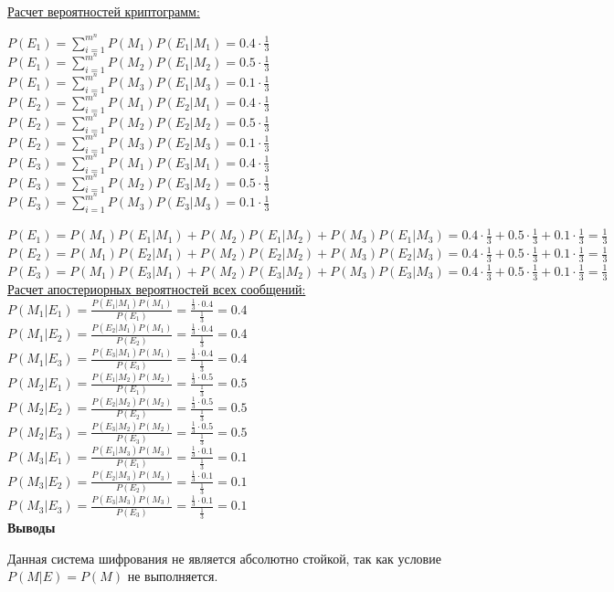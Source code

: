 \documentclass[a4paper,14pt]{extarticle}
\begin{document}
    \underline{Расчет вероятностей криптограмм:}
    \begin{multicols}{2}
    \noindent$P(E_1)=\sum\limits_{i=1}^{m^n} P(M_1)P(E_1|M_1) = 0.4\cdot\frac{1}{3}$\\
    $P(E_1)=\sum\limits_{i=1}^{m^n} P(M_2)P(E_1|M_2) = 0.5\cdot\frac{1}{3}$\\
    $P(E_1)=\sum\limits_{i=1}^{m^n} P(M_3)P(E_1|M_3) = 0.1\cdot\frac{1}{3}$\\
    $P(E_2)=\sum\limits_{i=1}^{m^n} P(M_1)P(E_2|M_1) = 0.4\cdot\frac{1}{3}$\\
    $P(E_2)=\sum\limits_{i=1}^{m^n} P(M_2)P(E_2|M_2) = 0.5\cdot\frac{1}{3}$\\
    $P(E_2)=\sum\limits_{i=1}^{m^n} P(M_3)P(E_2|M_3) = 0.1\cdot\frac{1}{3}$\\
    $P(E_3)=\sum\limits_{i=1}^{m^n} P(M_1)P(E_3|M_1) = 0.4\cdot\frac{1}{3}$\\
    $P(E_3)=\sum\limits_{i=1}^{m^n} P(M_2)P(E_3|M_2) = 0.5\cdot\frac{1}{3}$\\
    $P(E_3)=\sum\limits_{i=1}^{m^n} P(M_3)P(E_3|M_3) = 0.1\cdot\frac{1}{3}$\\
    \end{multicols}
    \noindent$P(E_1)=P(M_1)P(E_1|M_1)+P(M_2)P(E_1|M_2)+P(M_3)P(E_1|M_3)=0.4\cdot\frac{1}{3}+0.5\cdot\frac{1}{3}+0.1\cdot\frac{1}{3}=\frac{1}{3}$\\
    $P(E_2)=P(M_1)P(E_2|M_1)+P(M_2)P(E_2|M_2)+P(M_3)P(E_2|M_3)=0.4\cdot\frac{1}{3}+0.5\cdot\frac{1}{3}+0.1\cdot\frac{1}{3}=\frac{1}{3}$\\
    $P(E_3)=P(M_1)P(E_3|M_1)+P(M_2)P(E_3|M_2)+P(M_3)P(E_3|M_3)=0.4\cdot\frac{1}{3}+0.5\cdot\frac{1}{3}+0.1\cdot\frac{1}{3}=\frac{1}{3}$\\

    \underline{Расчет апостериорных вероятностей всех сообщений:}\\
    \noindent$P(M_1|E_1)=\frac{P(E_1|M_1)P(M_1)}{P(E_1)}=\frac{\frac{1}{3}\cdot0.4}{\frac{1}{3}}=0.4$\\
    $P(M_1|E_2)=\frac{P(E_2|M_1)P(M_1)}{P(E_2)}=\frac{\frac{1}{3}\cdot0.4}{\frac{1}{3}}=0.4$\\
    $P(M_1|E_3)=\frac{P(E_3|M_1)P(M_1)}{P(E_3)}=\frac{\frac{1}{3}\cdot0.4}{\frac{1}{3}}=0.4$\\
    $P(M_2|E_1)=\frac{P(E_1|M_2)P(M_2)}{P(E_1)}=\frac{\frac{1}{3}\cdot0.5}{\frac{1}{3}}=0.5$\\
    $P(M_2|E_2)=\frac{P(E_2|M_2)P(M_2)}{P(E_2)}=\frac{\frac{1}{3}\cdot0.5}{\frac{1}{3}}=0.5$\\
    $P(M_2|E_3)=\frac{P(E_3|M_2)P(M_2)}{P(E_3)}=\frac{\frac{1}{3}\cdot0.5}{\frac{1}{3}}=0.5$\\
    $P(M_3|E_1)=\frac{P(E_1|M_3)P(M_3)}{P(E_1)}=\frac{\frac{1}{3}\cdot0.1}{\frac{1}{3}}=0.1$\\
    $P(M_3|E_2)=\frac{P(E_2|M_3)P(M_3)}{P(E_2)}=\frac{\frac{1}{3}\cdot0.1}{\frac{1}{3}}=0.1$\\
    $P(M_3|E_3)=\frac{P(E_3|M_3)P(M_3)}{P(E_3)}=\frac{\frac{1}{3}\cdot0.1}{\frac{1}{3}}=0.1$\\
    \textbf{Выводы}

    Данная система шифрования не является абсолютно стойкой, так как условие $P(M|E)=P(M)$ не выполняется.
\end{document}

